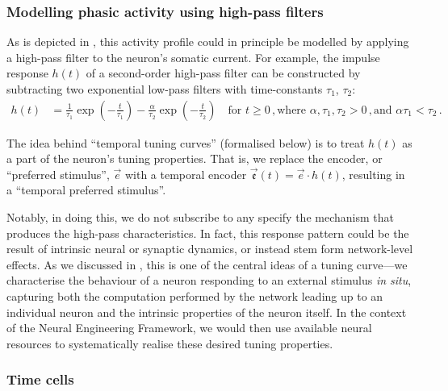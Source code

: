 \subsubsection{Modelling phasic activity using high-pass filters}
As is depicted in , this activity profile could in principle be modelled by applying a high-pass filter to the neuron's somatic current.
For example, the impulse response $h(t)$ of a second-order high-pass filter can be constructed by subtracting two exponential low-pass filters with time-constants $\tau_1$, $\tau_2$:
\begin{align}
	h(t) &= \frac{1}{\tau_1} \exp\left( -\frac{t}{\tau_1} \right) - \frac{\alpha}{\tau_2} \exp\left( -\frac{t}{\tau_2} \right) \quad \text{for } t \geq 0 \,, \text{where } \alpha, \tau_1, \tau_2 > 0 \,, \text{and } \alpha \tau_1 < \tau_2 \,.
	\label{eqn:high_pass}
\end{align}

The idea behind \enquote{temporal tuning curves} (formalised below) is to treat $h(t)$ as a part of the neuron's tuning properties.
That is, we replace the encoder, or \enquote{preferred stimulus}, $\vec e$ with a temporal encoder $\vec{\mathfrak{e}}(t) = \vec{e} \cdot h(t)$, resulting in a \enquote{temporal preferred stimulus}.

Notably, in doing this, we do not subscribe to any specify the mechanism that produces the high-pass characteristics.
In fact, this response pattern could be the result of intrinsic neural or synaptic dynamics, or instead stem form network-level effects.
As we discussed in , this is one of the central ideas of a tuning curve---we characterise the behaviour of a neuron responding to an external stimulus \emph{in situ}, capturing both the computation performed by the network leading up to an individual neuron and the intrinsic properties of the neuron itself.
In the context of the Neural Engineering Framework, we would then use available neural resources to systematically realise these desired tuning properties.

\subsubsection{Time cells}

